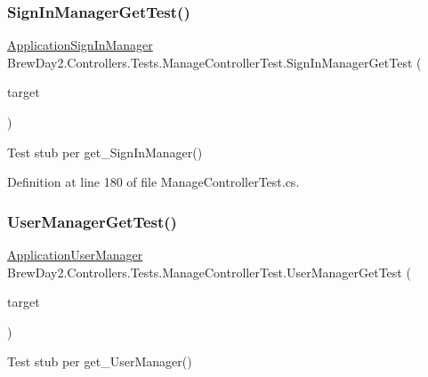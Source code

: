 \subsubsection{\texorpdfstring{Sign\+In\+Manager\+Get\+Test()}{SignInManagerGetTest()}}
{\footnotesize\ttfamily \mbox{\hyperlink{class_brew_day2_1_1_application_sign_in_manager}{Application\+Sign\+In\+Manager}} Brew\+Day2.\+Controllers.\+Tests.\+Manage\+Controller\+Test.\+Sign\+In\+Manager\+Get\+Test (\begin{DoxyParamCaption}\item[{\mbox{[}\+Pex\+Assume\+Under\+Test\mbox{]} \mbox{\hyperlink{class_brew_day2_1_1_controllers_1_1_manage_controller}{Manage\+Controller}}}]{target }\end{DoxyParamCaption})}



Test stub per get\+\_\+\+Sign\+In\+Manager()



Definition at line 180 of file Manage\+Controller\+Test.\+cs.

\mbox{\label{class_brew_day2_1_1_controllers_1_1_tests_1_1_manage_controller_test_a841d29dfeec1cb5ce8819476e2318e8e}} 
\subsubsection{\texorpdfstring{User\+Manager\+Get\+Test()}{UserManagerGetTest()}}
{\footnotesize\ttfamily \mbox{\hyperlink{class_brew_day2_1_1_application_user_manager}{Application\+User\+Manager}} Brew\+Day2.\+Controllers.\+Tests.\+Manage\+Controller\+Test.\+User\+Manager\+Get\+Test (\begin{DoxyParamCaption}\item[{\mbox{[}\+Pex\+Assume\+Under\+Test\mbox{]} \mbox{\hyperlink{class_brew_day2_1_1_controllers_1_1_manage_controller}{Manage\+Controller}}}]{target }\end{DoxyParamCaption})}



Test stub per get\+\_\+\+User\+Manager()



